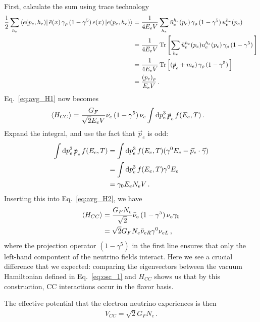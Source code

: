 First, calculate the sum using trace technology
\begin{align}\label{eq:helicity_sum}
    \frac{1}{2} \sum_{h_e} \bra{e(p_e,h_e)} \bar e(x) \,\gamma_\rho\, (1- \gamma^5)\, e(x)   \ket{e(p_e,h_e)} &= \frac{1}{4E_e V} \sum_{h_e} \bar{u}_e^{h_e}(p_e) \,\gamma_\rho\, (1- \gamma^5)\, u_e^{h_e}(p_e) \nonumber \\
    &= \frac{1}{4 E_e V} \Trace{\left[ \sum_{h_e} \bar{u}_e^{h_e}(p_e) u_e^{h_e}(p_e) \,\gamma_\rho\, (1- \gamma^5)\, \right]} \nonumber \\
    &= \frac{1}{4 E_e V} \Trace{\left[ (\slashed{p}_e + m_e ) \,\gamma_\rho\, (1- \gamma^5)\, \right]} \nonumber \\
    &= \frac{(p_e)_\rho}{E_e V}\,.
\end{align}
Eq.~\ref{eq:avg_H1} now becomes 
\begin{align}\label{eq:avg_H2}
    \left\langle {H_{CC}} \right \rangle &= \frac{G_F}{\sqrt{2}E_e V} \bar{\nu_e} \, (1- \gamma^5)\, \nu_e \int \dd p_e^3\, \slashed{p}_e\, f(E_e,T)\,.
\end{align}
Expand the integral, and use the fact that $\vec{p}_e$ is odd:
\begin{align}
    \int \dd p_e^3\, \slashed{p}_e\, f(E_e,T) &= \int \dd p_e^3\, f(E_e,T) (\gamma^0 E_e - \vec{p}_e \cdot \vec{\gamma}) \nonumber \\
                                              &= \int \dd p_e^3\, f(E_e,T) \gamma^0 E_e \nonumber \\
                                              &= \gamma_0 E_e N_e V\,.
\end{align}
Inserting this into Eq.~\ref{eq:avg_H2}, we have
\begin{align}
    \left\langle {H_{CC}} \right \rangle &= \frac{G_F N_e}{\sqrt{2}} \bar{\nu}_e \, (1- \gamma^5)\, \nu_e \gamma_0 \nonumber \\
            &= \sqrt{2}G_F N_e \bar{\nu}_{eR} \gamma^0 \nu_{eL}\,,
\end{align}
where the projection operator $(1- \gamma^5)$ in the first line ensures that only the left-hand compontent of the neutrino fields interact.
Here we see a crucial difference that we expected: comparing the eigenvectors between the vacuum Hamiltonian defined in Eq.~\ref{eq:osc_1} and $H_{CC}$ shows us 
that by this construction, CC interactions occur in the flavor basis.

The effective 
potential that the electron neutrino experiences is then
\begin{align}\label{eq:V_CC1}
    V_{CC} = \sqrt{2}G_F N_e\,.
\end{align}



